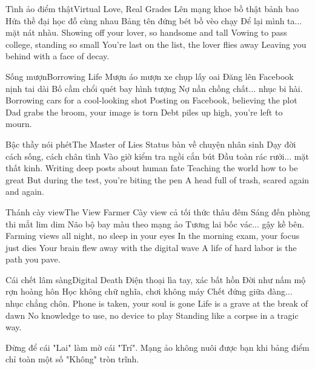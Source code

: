 \begin{tutuyetbox}{Tình ảo điểm thật}{Virtual Love, Real Grades}
Lên mạng khoe bồ thật bảnh bao
Hứa thề đại học đỗ cùng nhau
Bảng tên đứng bét bồ vèo chạy
Để lại mình ta... mặt nát nhàu.
\tcblower
Showing off your lover, so handsome and tall
Vowing to pass college, standing so small
You're last on the list, the lover flies away
Leaving you behind with a face of decay.
\end{tutuyetbox}

\begin{tutuyetbox}{Sống mượn}{Borrowing Life}
Mượn áo mượn xe chụp lấy oai
Đăng lên Facebook nịnh tai dài
Bố cầm chổi quét bay hình tượng
Nợ nần chồng chất... nhục bi hài.
\tcblower
Borrowing cars for a cool-looking shot
Posting on Facebook, believing the plot
Dad grabs the broom, your image is torn
Debt piles up high, you're left to mourn.
\end{tutuyetbox}

\begin{tutuyetbox}{Bậc thầy nói phét}{The Master of Lies}
Status bàn về chuyện nhân sinh
Dạy đời cách sống, cách chân tình
Vào giờ kiểm tra ngồi cắn bút
Đầu toàn rác rưởi... mặt thất kinh.
\tcblower
Writing deep posts about human fate
Teaching the world how to be great
But during the test, you're biting the pen
A head full of trash, scared again and again.
\end{tutuyetbox}

\begin{tutuyetbox}{Thánh cày view}{The View Farmer}
Cày view cả tối thức thâu đêm
Sáng đến phòng thi mắt lim dim
Não bộ bay màu theo mạng ảo
Tương lai bốc vác... gậy kề bên.
\tcblower
Farming views all night, no sleep in your eyes
In the morning exam, your focus just dies
Your brain flew away with the digital wave
A life of hard labor is the path you pave.
\end{tutuyetbox}

\begin{tutuyetbox}{Cái chết lâm sàng}{Digital Death}
Điện thoại lìa tay, xác bất hồn
Đời như nấm mộ rợn hoàng hôn
Học không chữ nghĩa, chơi không máy
Chết đứng giữa đàng... nhục chẳng chôn.
\tcblower
Phone is taken, your soul is gone
Life is a grave at the break of dawn
No knowledge to use, no device to play
Standing like a corpse in a tragic way.
\end{tutuyetbox}

\begin{ghichu}
Đừng để cái "Lai" làm mờ cái "Trí". Mạng ảo không nuôi được bạn khi bảng điểm chỉ toàn một số "Không" tròn trĩnh.
\end{ghichu}